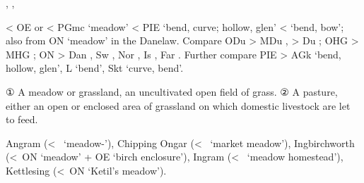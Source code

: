 \documentclass[12pt,letterpaper,oneside,article,draft]{memoir}
\begin{document}
\begin{Lemma}
\begin{Also}
	, , 
\end{Also}
\begin{Etymology}
	< OE  or  < PGmc  ‘meadow’
		< PIE  ‘bend, curve; hollow, glen’ <  ‘bend, bow’;
		also from ON  ‘meadow’ in the Danelaw.
	Compare
	ODu  > MDu ,  > Du ;
	OHG  > MHG ;
	ON  > Dan , Sw , Nor , Is , Far .
	Further compare
	PIE  > AGk   ‘bend, hollow, glen’, L  ‘bend’,
		Skt   ‘curve, bend’.
\end{Etymology}
\begin{Definitions}
	① A meadow or grassland, an uncultivated open field of grass.
	② A pasture, either an open or enclosed area of grassland on which domestic livestock are let to feed.
\end{Definitions}
\begin{Examples}
	Angram (<~ ‘meadow-’), Chipping Ongar (<~ ‘market meadow’), Ingbirchworth (<~ON  ‘meadow’ + OE  ‘birch enclosure’), Ingram (<~ ‘meadow homestead’), Kettlesing (<~ON  ‘Ketil’s meadow’).
\end{Examples}
\end{Lemma}
\end{document}
